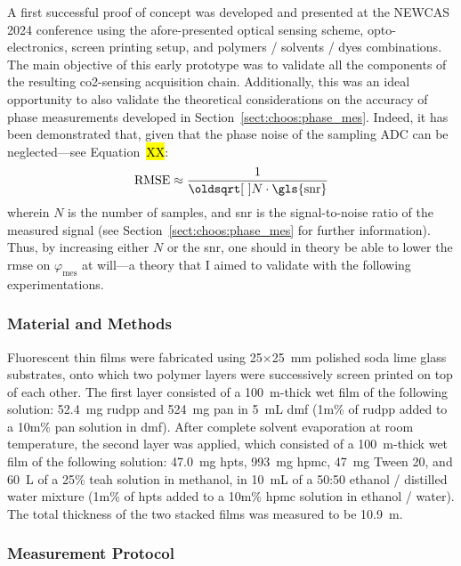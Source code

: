 A first successful proof of concept was developed and presented at the NEWCAS 2024 conference\cite{dervieux2024newcas} using the afore-presented optical sensing scheme, opto-electronics, screen printing setup, and polymers / solvents / dyes combinations. The main objective of this early prototype was to validate all the components of the resulting \gls{co2}-sensing acquisition chain. Additionally, this was an ideal opportunity to also validate the theoretical considerations on the accuracy of phase measurements developed in Section~\ref{sect:choos:phase_mes}. Indeed, it has been demonstrated that, given that the phase noise of the sampling ADC can be neglected---see Equation~\hl{XX}:
\begin{equation}\label{eq:thin_film:rmse_phase_noise_gene}
	\text{RMSE} \approx \frac{1}{\sqrt{N \cdot \text{\gls{snr}}}}
\end{equation}
wherein $N$ is the number of samples, and \gls{snr} is the signal-to-noise ratio of the measured signal (see Section~\ref{sect:choos:phase_mes} for further information). Thus, by increasing either $N$ or the \gls{snr}, one should in theory be able to lower the \gls{rmse} on $\varphi_\text{mes}$ at will---a theory that I aimed to validate with the following experimentations.

\subsubsection{Material and Methods}\label{subsect:thin_film:experimental:newcas_mm}

Fluorescent thin films were fabricated using 25$\times$25~mm polished soda lime glass substrates, onto which two polymer layers were successively screen printed on top of each other. The first layer consisted of a 100~\textmu{}m-thick wet film of the following solution: 52.4~mg \gls{rudpp} and 524~mg \gls{pan} in 5~mL \gls{dmf} (1m\% of \gls{rudpp} added to a 10m\% \gls{pan} solution in \gls{dmf}). After complete solvent evaporation at room temperature, the second layer was applied, which consisted of a 100~\textmu{}m-thick wet film of the following solution: 47.0~mg \gls{hpts}, 993~mg \gls{hpmc}, 47~mg Tween 20, and 60~\textmu{}L of a 25\% \gls{teah} solution in methanol, in 10~mL of a 50:50 ethanol / distilled water mixture (1m\% of \gls{hpts} added to a 10m\% \gls{hpmc} solution in ethanol / water). The total thickness of the two stacked films was measured to be 10.9~\textmu{}m.

\subsubsection{Measurement Protocol}

